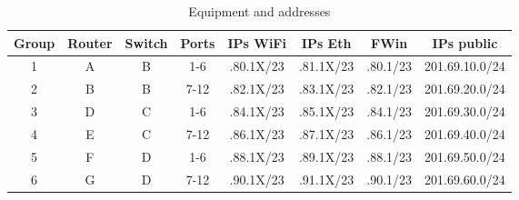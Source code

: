 \begin{table}
\sffamily\small
\centering
\begin{tabular}{cccccccc}
\hline
Group & Router & Switch & Ports & IPs WiFi & IPs Eth & FWin & IPs public \\
\hline
1 & A & B & 1-6 & .80.1X/23 & .81.1X/23 & .80.1/23 & 201.69.10.0/24 \\
2 & B & B & 7-12 & .82.1X/23 & .83.1X/23 & .82.1/23 & 201.69.20.0/24 \\
3 & D & C & 1-6 & .84.1X/23 & .85.1X/23 & .84.1/23 & 201.69.30.0/24 \\
4 & E & C & 7-12 & .86.1X/23 & .87.1X/23 & .86.1/23 & 201.69.40.0/24 \\
5 & F & D & 1-6 & .88.1X/23 & .89.1X/23 & .88.1/23 & 201.69.50.0/24 \\
6 & G & D & 7-12 & .90.1X/23 & .91.1X/23 & .90.1/23 & 201.69.60.0/24 \\

\end{tabular}
\caption{Equipment and addresses}
\label{tab:equipment-and-addresses}
\end{table}


